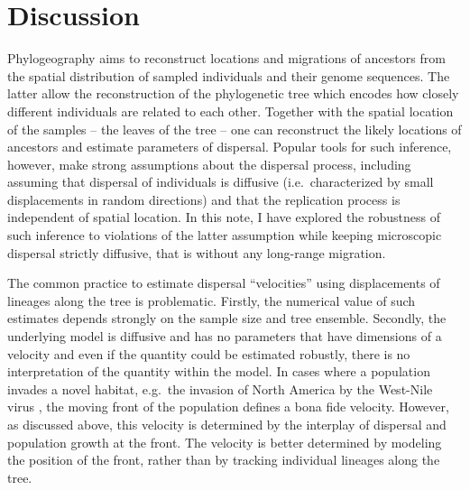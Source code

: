\documentclass[aps,rmp, twocolumn]{revtex4}
\begin{document}
\section*{Discussion}
Phylogeography aims to reconstruct locations and migrations of ancestors from the spatial distribution of sampled individuals and their genome sequences.
The latter allow the reconstruction of the phylogenetic tree which encodes how closely different individuals are related to each other.
Together with the spatial location of the samples -- the leaves of the tree -- one can reconstruct the likely locations of ancestors and estimate parameters of dispersal.
Popular tools for such inference, however, make strong assumptions about the dispersal process, including assuming that dispersal of individuals is diffusive (i.e.~characterized by small displacements in random directions) and that the replication process is independent of spatial location.
In this note, I have explored the robustness of such inference to violations of the latter assumption while keeping microscopic dispersal strictly diffusive, that is without any long-range migration.

The common practice to estimate dispersal ``velocities'' using displacements of lineages along the tree \citep{dellicour_relax_2021} is problematic.
Firstly, the numerical value of such estimates depends strongly on the sample size and tree ensemble.
Secondly, the underlying model is diffusive and has no parameters that have dimensions of a velocity and even if the quantity could be estimated robustly, there is no interpretation of the quantity within the model.
In cases where a population invades a novel habitat, e.g.~the invasion of North America by the West-Nile virus \citep{pybus_unifying_2012}, the moving front of the population defines a bona fide velocity.
However, as discussed above, this velocity is determined by the interplay of dispersal and population growth at the front.
The velocity is better determined by modeling the position of the front, rather than by tracking individual lineages along the tree.
\end{document}
